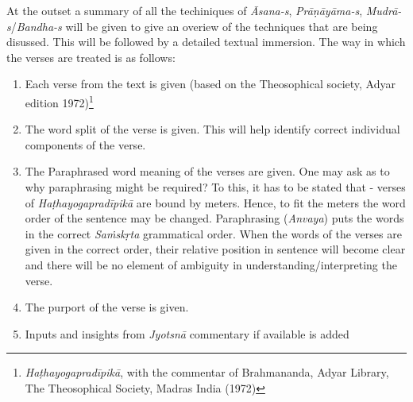 At the outset a summary of all the techiniques of \textit{Āsana-s}, \textit{Prāṇāyāma-s}, \textit{Mudrā-s}/\textit{Bandha-s} will be given to give an overiew of the techniques that are being disussed. This will be followed by a detailed textual immersion. The way in which the verses are treated is as follows:
\begin{enumerate}
\itemsep=0pt
\item Each verse from the text is given (based on the Theosophical society, Adyar edition 1972)\footnote{\textit{Haṭhayogapradīpikā}, with the commentar of Brahmananda, Adyar Library, The Theosophical Society, Madras India (1972)}
\item The word split of the verse is given. This will help identify correct individual components of the verse.   
\item The Paraphrased word meaning of the verses are given. One may ask as to why paraphrasing might be required? To this, it has to be stated that - verses of \textit{Haṭhayogapradīpikā} are bound by meters. Hence, to fit the meters the word order of the sentence may be changed. Paraphrasing (\textit{Anvaya}) puts the words in the correct \textit{Saṁskṛta} grammatical order. When the words of the verses are given in the correct order, their relative position in sentence will become clear and there will be no element of ambiguity in understanding/interpreting the verse.    
\item The purport of the verse is given. 
\item Inputs and insights from \textit{Jyotsnā} commentary if available is added 
\end{enumerate}
